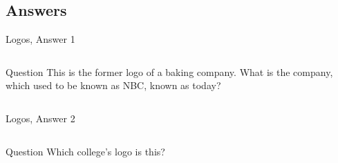\documentclass[11pt]{beamer}
\begin{document}
\subsection{Answers}
\begin{frame}[t]{Logos, Answer 1}
\begin{columns}[T,totalwidth=\linewidth]
\begin{column}{0.32\linewidth}
\begin{block}{Question}
This is the former logo of a baking company. What is the company, which used to be known as NBC, known as today?
\end{block}
\end{column}
\begin{column}{0.65\linewidth}
\begin{center}
\texttt{[image: \{Images/nabisco]}.jpg}
\end{center}
\end{column}
\end{columns}
\end{frame}
\begin{frame}[t]{Logos, Answer 2}
\begin{columns}[T,totalwidth=\linewidth]
\begin{column}{0.32\linewidth}
\begin{block}{Question}
Which college's logo is this?
\end{block}
\end{column}
\begin{column}{0.65\linewidth}
\begin{center}
\texttt{[image: \{Images/cornell]}.png}
\end{center}
\end{column}
\end{columns}
\end{frame}
\end{document}
